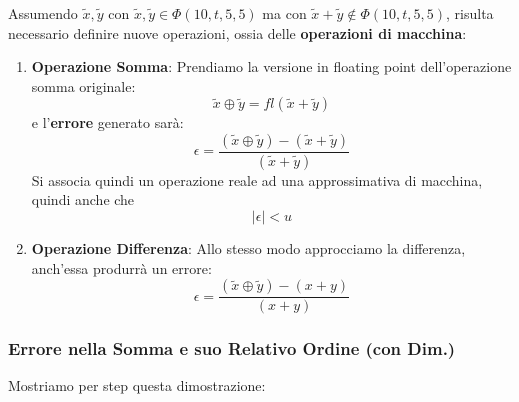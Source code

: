 \documentclass{article}
\begin{document}
Assumendo $\tilde{x},\tilde{y}$ con $\tilde{x},\tilde{y} \in \Phi(10,t,5,5)$ ma con $\tilde{x}+\tilde{y} \notin \Phi(10,t,5,5)$, risulta necessario definire nuove operazioni, ossia delle \textbf{operazioni di macchina}:
\begin{enumerate}
    \item \textbf{Operazione Somma}: Prendiamo la versione in floating point dell'operazione somma originale:
        \[\tilde{x} \oplus \tilde{y} = fl(\tilde{x}+\tilde{y})\]
    e l'\textbf{errore} generato sarà:
    \vspace*{10px}
    \[ \epsilon = \frac{(\tilde{x} \oplus \tilde{y}) - (\tilde{x} + \tilde{y})}{(\tilde{x} + \tilde{y})} \]
    \vspace*{10px}
    Si associa quindi un operazione reale ad una approssimativa di macchina, quindi anche che
    \[ |\epsilon| < u \]
    \item \textbf{Operazione Differenza}: Allo stesso modo approcciamo la differenza, anch'essa produrrà un errore:
    \vspace*{10px}
    \[ \epsilon = \frac{(\tilde{x} \oplus \tilde{y}) - (x + y)}{(x + y)} \]
    \vspace*{10px}
\end{enumerate}

\subsubsection{Errore nella Somma e suo Relativo Ordine (con Dim.)}

Mostriamo per step questa dimostrazione:
\end{document}
